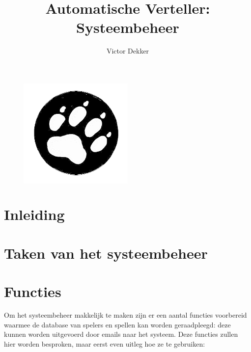 \documentclass[12pt]{article}
\author{Victor Dekker}
\title{Automatische Verteller:\\Systeembeheer}
\begin{document}

\maketitle

\begin{figure}[h!]
  \centering
  \includegraphics[width=0.5\textwidth]{Welp2.png}
\end{figure}

\newpage
\tableofcontents
\newpage

\section{Inleiding}

  
  
\section{Taken van het systeembeheer}

\section{Functies}

  Om het systeembeheer makkelijk te maken zijn er een aantal functies voorbereid waarmee de database van spelers en spellen kan worden geraadpleegd: deze kunnen worden uitgevoerd door emails naar het systeem. Deze functies zullen hier worden besproken, maar eerst even uitleg hoe ze te gebruiken:
  
\end{document}
